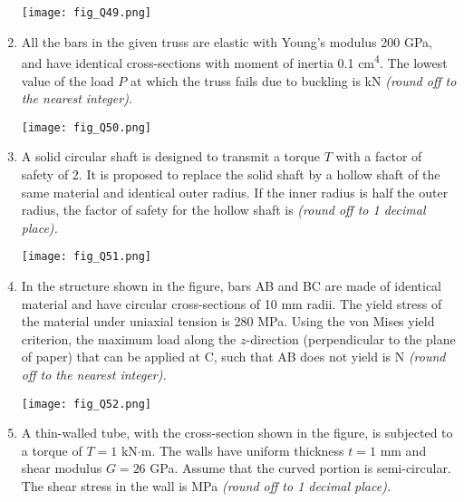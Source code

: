 \documentclass[12pt]{article}
\begin{document}
\begin{enumerate}[label=Q.\arabic*, start=26]
		\begin{center}
			\texttt{[image: fig\_Q49.png]}
		\end{center}

	\item All the bars in the given truss are elastic with Young’s modulus 200 GPa, and have identical cross-sections with moment of inertia 0.1 cm\textsuperscript{4}. The lowest value of the load $P$ at which the truss fails due to buckling is \underline{\hspace{2cm}} kN \textit{(round off to the nearest integer).}

		\begin{center}
			\texttt{[image: fig\_Q50.png]}
		\end{center}
	\item A solid circular shaft is designed to transmit a torque $T$ with a factor of safety of 2. It is proposed to replace the solid shaft by a hollow shaft of the same material and identical outer radius. If the inner radius is half the outer radius, the factor of safety for the hollow shaft is \underline{\hspace{2cm}} \textit{(round off to 1 decimal place).}

		\begin{center}
			\texttt{[image: fig\_Q51.png]}
		\end{center}
	\item In the structure shown in the figure, bars AB and BC are made of identical material and have circular cross-sections of 10 mm radii. The yield stress of the material under uniaxial tension is 280 MPa. Using the von Mises yield criterion, the maximum load along the $z$-direction (perpendicular to the plane of paper) that can be applied at C, such that AB does not yield is \underline{\hspace{2cm}} N \textit{(round off to the nearest integer).}

		\begin{center}
			\texttt{[image: fig\_Q52.png]}
		\end{center}

	\item A thin-walled tube, with the cross-section shown in the figure, is subjected to a torque of $T = 1$ kN$\cdot$m. The walls have uniform thickness $t = 1$ mm and shear modulus $G = 26$ GPa. Assume that the curved portion is semi-circular. The shear stress in the wall is \underline{\hspace{2cm}} MPa \textit{(round off to 1 decimal place).}


\end{enumerate}
\end{document}
